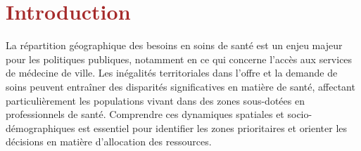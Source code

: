 \documentclass[
]{article}
\author{}
\date{\vspace{-2.5em}}
\begin{document}
\setcounter{tocdepth}{5}                
\renewcommand\contentsname{\begin{center}\textcolor{brown}{Sommaire}\end{center}}
\AtBeginShipout{
  \ifnum\value{page}=1\thispagestyle{empty}\fi}
\pagestyle{fancy}
\fancyhf{}
\renewcommand{\headrulewidth}{0.4pt}
\renewcommand{\footrulewidth}{0.4pt}
\fancyhead[R]{\textcolor{brown}{@Alex, Ali, Richard \& Toussaint}}
\fancyfoot[C]{\thepage}

\tableofcontents

\newpage

\renewcommand\listtablename{\begin{center}\textcolor{brown}{Liste des Tableaux}\end{center}}
\renewcommand\listfigurename{\begin{center}\textcolor{brown}{Liste des Figures}\end{center}}

\setlength{\cftfignumwidth}{3em}
\setlength{\cfttabnumwidth}{3em}

\listoftables

\newpage

\listoffigures

\newpage

\section{\texorpdfstring{\textcolor{brown} {Introduction}}{}}\label{section}

La répartition géographique des besoins en soins de santé est un enjeu
majeur pour les politiques publiques, notamment en ce qui concerne
l'accès aux services de médecine de ville. Les inégalités territoriales
dans l'offre et la demande de soins peuvent entraîner des disparités
significatives en matière de santé, affectant particulièrement les
populations vivant dans des zones sous-dotées en professionnels de
santé. Comprendre ces dynamiques spatiales et socio-démographiques est
essentiel pour identifier les zones prioritaires et orienter les
décisions en matière d'allocation des ressources.
\end{document}
